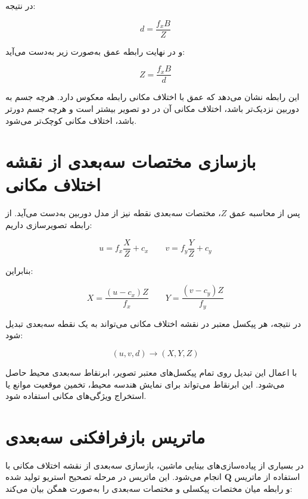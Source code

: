 در نتیجه:

\begin{equation}
	d = \frac{f_x B}{Z}
\end{equation}

و در نهایت رابطه عمق به‌صورت زیر به‌دست می‌آید:

\begin{equation}
	Z =
	\frac{f_x B}{d}
	\label{eq:depth_from_disparity_proof}
\end{equation}

این رابطه نشان می‌دهد که عمق با اختلاف مکانی رابطه معکوس دارد. هرچه جسم به دوربین نزدیک‌تر باشد، اختلاف مکانی آن در دو تصویر بیشتر است و هرچه جسم دورتر باشد، اختلاف مکانی کوچک‌تر می‌شود.

\section{بازسازی مختصات سه‌بعدی از نقشه اختلاف مکانی}

پس از محاسبه عمق \(Z\)، مختصات سه‌بعدی نقطه نیز از مدل دوربین به‌دست می‌آید. از رابطه تصویرسازی داریم:

\begin{equation}
	u = f_x\frac{X}{Z}+c_x
	\qquad
	v = f_y\frac{Y}{Z}+c_y
\end{equation}

بنابراین:

\begin{equation}
	X =
	\frac{(u-c_x)Z}{f_x}
	\qquad
	Y =
	\frac{(v-c_y)Z}{f_y}
	\label{eq:xyz_from_uvz}
\end{equation}

در نتیجه، هر پیکسل معتبر در نقشه اختلاف مکانی می‌تواند به یک نقطه سه‌بعدی تبدیل شود:

\begin{equation}
	(u,v,d)
	\rightarrow
	(X,Y,Z)
\end{equation}

با اعمال این تبدیل روی تمام پیکسل‌های معتبر تصویر، ابرنقاط سه‌بعدی محیط حاصل می‌شود. این ابرنقاط می‌تواند برای نمایش هندسه محیط، تخمین موقعیت موانع یا استخراج ویژگی‌های مکانی استفاده شود.

\section{ماتریس بازفرافکنی سه‌بعدی}

در بسیاری از پیاده‌سازی‌های بینایی ماشین، بازسازی سه‌بعدی از نقشه اختلاف مکانی با استفاده از ماتریس \(\mathbf{Q}\) انجام می‌شود. این ماتریس در مرحله تصحیح استریو تولید شده و رابطه میان مختصات پیکسلی و مختصات سه‌بعدی را به‌صورت همگن بیان می‌کند:

